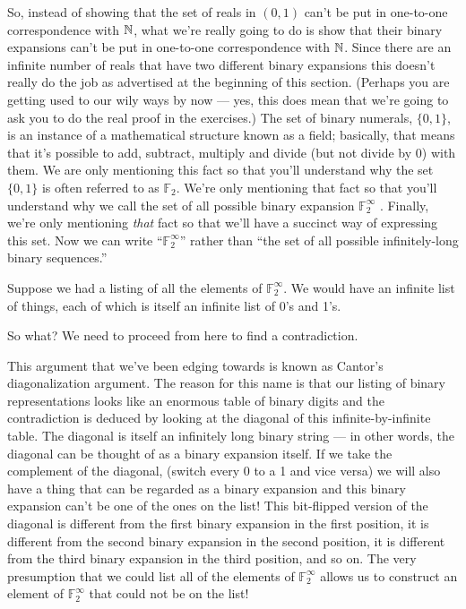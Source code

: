 So, instead of showing that the set of reals in $(0, 1)$ can't be put 
in one-to-one
correspondence with ${\mathbb N}$, what we're really going to do is show 
that their binary expansions can't be put in one-to-one correspondence 
with ${\mathbb N}$.  Since
there are an infinite number of reals that have two different binary expansions
this doesn't really do the job as advertised at the beginning of this section.
(Perhaps you are getting used to our wily ways by now --- yes, this does
mean that we're going to ask you to do the real proof in the exercises.)
The set of binary numerals, $\{0, 1\}$, is an instance of a mathematical 
structure known as a field; basically, that means that it's possible to 
add, subtract, multiply and divide (but not divide by 0) with them. 
We are only mentioning this fact so that you'll understand why the set 
$\{0, 1\}$ is often referred to as ${\mathbb F}_2$.  We're only mentioning that 
fact so that you'll understand why we call the set of all possible 
binary expansion ${\mathbb F}_2^\infty$ .  Finally, we're only mentioning \emph{that} 
fact so that we'll have a succinct way of expressing this set.  
Now we can write ``${\mathbb F}_2^\infty$'' rather than 
``the set of all possible infinitely-long binary sequences.''

Suppose we had a listing of all the elements of ${\mathbb F}_2^\infty$.  We would have an
infinite list of things, each of which is itself an infinite list 
of 0's and 1's.

So what? We need to proceed from here to find a contradiction.

This argument that we've been edging towards is known as Cantor's 
diagonalization argument. The reason for this name is that our 
listing of binary representations looks like an enormous table 
of binary digits and the contradiction is deduced by looking at 
the diagonal of this infinite-by-infinite table.
The diagonal is itself an infinitely long binary string --- in other words, the
diagonal can be thought of as a binary expansion itself.  
If we take the complement
of the diagonal, (switch every 0 to a 1 and vice versa) we will also
have a thing that can be regarded as a binary expansion and this binary
expansion can't be one of the ones on the list!  This bit-flipped version of
the diagonal is different from the first binary expansion in the first 
position,
it is different from the second binary expansion in the second position, it is
different from the third binary expansion in the third position, and so on.
The very presumption that we could list all of the elements of ${\mathbb F}_2^\infty$ 
allows us
to construct an element of ${\mathbb F}_2^\infty$ that could not be on the list!


